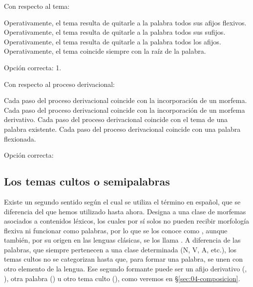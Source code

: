 \begin{ejercicio}
\begin{consignas}
  \item Con respecto al tema:
        \begin{exe}
          \ex Operativamente, el tema resulta de quitarle a la palabra todos sus
              afijos flexivos.
          \ex Operativamente, el tema resulta de quitarle a la palabra todos sus
              sufijos.
          \ex Operativamente, el tema resulta de quitarle a la palabra todos los
              afijos.
          \ex Operativamente, el tema coincide siempre con la raíz de la
              palabra.
        \end{exe}
        \begin{resuelto}
        Opción correcta: 1.
        \end{resuelto}
  \item Con respecto al proceso derivacional:
        \begin{exe}
          \ex Cada paso del proceso derivacional coincide con la incorporación
              de un morfema.
          \ex Cada paso del proceso derivacional coincide con la incorporación
              de un morfema derivativo.
          \ex Cada paso del proceso derivacional coincide con el tema de una
              palabra existente.
          \ex Cada paso del proceso derivacional coincide con una palabra
              flexionada.
        \end{exe}
        Opción correcta:\completar[1]
\end{consignas}
\end{ejercicio}

\subsection{Los temas cultos o semipalabras}\label{sec:04-temascultos}

Existe un segundo sentido según el cual se utiliza el término  en
español, que se diferencia del que hemos utilizado hasta ahora. Designa a una
clase de morfemas asociados a contenidos léxicos, los cuales por sí solos no
pueden recibir morfología flexiva ni funcionar como palabras, por lo que se los
conoce como , aunque también, por su origen en las lenguas
clásicas, se los llama . A diferencia de las palabras, que
siempre pertenecen a una clase determinada (N, V, A, etc.), los temas cultos no
se categorizan hasta que, para formar una palabra, se unen con otro elemento de
la lengua. Ese segundo formante puede ser un afijo derivativo (,
), otra palabra () u otro tema culto
(), como veremos en §\ref{sec:04-composicion}.

